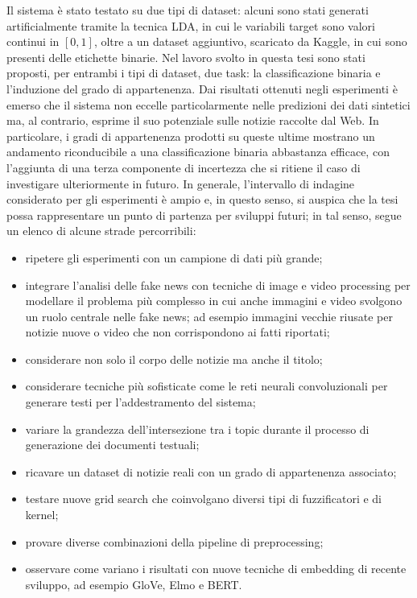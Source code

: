 \documentclass[12pt]{report}
\theoremstyle{definition}
\begin{document}
Il sistema è stato testato su due tipi di dataset: alcuni sono stati generati artificialmente tramite la tecnica LDA, in cui le variabili target sono valori continui in $[0,1]$, oltre a un dataset aggiuntivo, scaricato da Kaggle, in cui sono presenti delle etichette binarie.
Nel lavoro svolto in questa tesi sono stati proposti, per entrambi i tipi di dataset, due task: la classificazione binaria e l'induzione del grado di appartenenza. Dai risultati ottenuti negli esperimenti è emerso che il sistema non eccelle particolarmente nelle predizioni dei dati sintetici ma, al contrario, esprime il suo potenziale sulle notizie raccolte dal Web. In particolare, i gradi di appartenenza prodotti su queste ultime mostrano un andamento riconducibile a una classificazione binaria abbastanza efficace, con l'aggiunta di una terza componente di incertezza che si ritiene il caso di investigare ulteriormente in futuro.
In generale, l'intervallo di indagine considerato per gli esperimenti è ampio e, in questo senso, si auspica che la tesi possa rappresentare un punto di partenza per sviluppi futuri; in tal senso, segue un elenco di alcune strade percorribili:
\begin{itemize}
    \item ripetere gli esperimenti con un campione di dati più grande;
    \item integrare l'analisi delle fake news con tecniche di image e video processing per modellare il problema più complesso in cui anche immagini e video svolgono un ruolo centrale nelle fake news; ad esempio immagini vecchie riusate per notizie nuove o video che non corrispondono ai fatti riportati;
    \item considerare non solo il corpo delle notizie ma anche il titolo;
    \item considerare tecniche più sofisticate come le reti neurali convoluzionali per generare testi per l'addestramento del sistema;
    \item variare la grandezza dell'intersezione tra i topic durante il processo di generazione dei documenti testuali;
    \item ricavare un dataset di notizie reali con un grado di appartenenza associato;
    \item testare nuove grid search che coinvolgano diversi tipi di fuzzificatori e di kernel;
    \item provare diverse combinazioni della pipeline di preprocessing;
    \item osservare come variano i risultati con nuove tecniche di embedding di recente sviluppo, ad esempio GloVe, Elmo e BERT.
\end{itemize}
\end{document}
